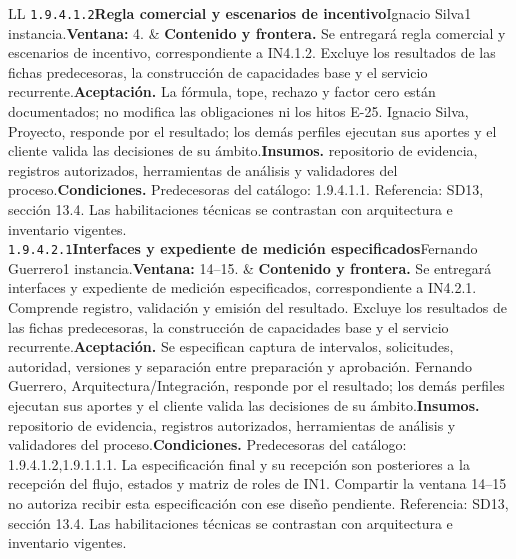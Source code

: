 \begin{longtable}{L{\tabcolsep\relax}L{\tabcolsep\relax}}
\texttt{1.\allowbreak{}9.\allowbreak{}4.\allowbreak{}1.\allowbreak{}2}\newline{}\textbf{Regla comercial y escenarios de incentivo}\newline{}Ignacio Silva\newline{}1 instancia.\newline{}\textbf{Ventana:} 4. & \textbf{Contenido y frontera.} Se entregará regla comercial y escenarios de incentivo, correspondiente a IN4.1.2. Excluye los resultados de las fichas predecesoras, la construcción de capacidades base y el servicio recurrente.\newline{}\textbf{Aceptación.} La fórmula, tope, rechazo y factor cero están documentados; no modifica las obligaciones ni los hitos E-25. Ignacio Silva, Proyecto, responde por el resultado; los demás perfiles ejecutan sus aportes y el cliente valida las decisiones de su ámbito.\newline{}\textbf{Insumos.} repositorio de evidencia, registros autorizados, herramientas de análisis y validadores del proceso.\newline{}\textbf{Condiciones.} Predecesoras del catálogo: 1.9.4.1.1. Referencia: SD13, sección 13.4. Las habilitaciones técnicas se contrastan con arquitectura e inventario vigentes.\\\hline
\texttt{1.\allowbreak{}9.\allowbreak{}4.\allowbreak{}2.\allowbreak{}1}\newline{}\textbf{Interfaces y expediente de medición especificados}\newline{}Fernando Guerrero\newline{}1 instancia.\newline{}\textbf{Ventana:} 14--15. & \textbf{Contenido y frontera.} Se entregará interfaces y expediente de medición especificados, correspondiente a IN4.2.1. Comprende registro, validación y emisión del resultado. Excluye los resultados de las fichas predecesoras, la construcción de capacidades base y el servicio recurrente.\newline{}\textbf{Aceptación.} Se especifican captura de intervalos, solicitudes, autoridad, versiones y separación entre preparación y aprobación. Fernando Guerrero, Arquitectura/Integración, responde por el resultado; los demás perfiles ejecutan sus aportes y el cliente valida las decisiones de su ámbito.\newline{}\textbf{Insumos.} repositorio de evidencia, registros autorizados, herramientas de análisis y validadores del proceso.\newline{}\textbf{Condiciones.} Predecesoras del catálogo: 1.9.4.1.2,1.9.1.1.1. La especificación final y su recepción son posteriores a la recepción del flujo, estados y matriz de roles de IN1. Compartir la ventana 14--15 no autoriza recibir esta especificación con ese diseño pendiente. Referencia: SD13, sección 13.4. Las habilitaciones técnicas se contrastan con arquitectura e inventario vigentes.\\\hline

\end{longtable}
